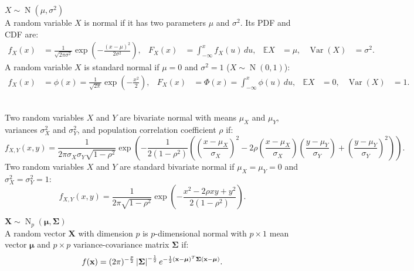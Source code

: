\documentclass{huhtakm-template-book-v2}
\newcommand{\expect}{\mathbb{E}}
\DeclareMathOperator{\N}{N}
\DeclareMathOperator{\Var}{Var}
\begin{document}
    \begin{seg} $X \sim \N(\mu,\sigma^{2})$\\
        A random variable $X$ is normal if it has two parameters $\mu$ and $\sigma^{2}$. Its PDF and CDF are:
        \begin{align*}
            f_{X}(x) &= \frac{1}{\sqrt{2\pi\sigma^{2}}}\exp\left(-\frac{(x-\mu)^{2}}{2\sigma^{2}}\right), & F_{X}(x) &= \int_{-\infty}^{x}f_{X}(u)\,du, & \expect{X} &= \mu, & \Var(X) &= \sigma^{2}.
        \end{align*}
        A random variable $X$ is standard normal if $\mu = 0$ and $\sigma^{2} = 1$ ($X \sim \N(0,1)$):
        \begin{align*}
            f_{X}(x) &= \phi(x) = \frac{1}{\sqrt{2\pi}}\exp\left(-\frac{x^{2}}{2}\right), & F_{X}(x) &= \Phi(x) = \int_{-\infty}^{x}\phi(u)\,du, & \expect{X} &= 0, & \Var(X) &= 1.
        \end{align*}
    \end{seg}
    \begin{seg}\\
        Two random variables $X$ and $Y$ are bivariate normal with means $\mu_{X}$ and $\mu_{Y}$, variances $\sigma_{X}^{2}$ and $\sigma_{Y}^{2}$, and population correlation coefficient $\rho$ if:
        \begin{equation*}
            f_{X,Y}(x, y) = \frac{1}{2\pi\sigma_{X}\sigma_{Y}\sqrt{1-\rho^{2}}}\exp\left(-\frac{1}{2(1-\rho^{2})}\left(\left(\frac{x-\mu_{X}}{\sigma_{X}}\right)^{2}-2\rho\left(\frac{x-\mu_{X}}{\sigma_{X}}\right)\left(\frac{y-\mu_{Y}}{\sigma_{Y}}\right)+\left(\frac{y-\mu_{Y}}{\sigma_{Y}}\right)^{2}\right)\right).
        \end{equation*}
        Two random variables $X$ and $Y$ are standard bivariate normal if $\mu_{X} = \mu_{Y} = 0$ and $\sigma_{X}^{2} = \sigma_{Y}^{2} = 1$:
        \begin{equation*}
            f_{X,Y}(x, y) = \frac{1}{2\pi\sqrt{1-\rho^{2}}}\exp\left(-\frac{x^{2}-2\rho xy+y^{2}}{2(1-\rho^{2})}\right).
        \end{equation*}
    \end{seg}
    \begin{seg} $\mathbf{X} \sim \N_{p}(\boldsymbol{\mu},\mathbf{\Sigma})$\\
        A random vector $\mathbf{X}$ with dimension $p$ is $p$-dimensional normal with $p\times 1$ mean vector $\boldsymbol{\mu}$ and $p\times p$ variance-covariance matrix $\mathbf{\Sigma}$ if:
        \begin{equation*}
            f(\mathbf{x}) = (2\pi)^{-\frac{p}{2}}\left|{\mathbf{\Sigma}}\right|^{-\frac{1}{2}}e^{-\frac{1}{2}(\mathbf{x}-\boldsymbol{\mu})^{T}\mathbf{\Sigma}(\mathbf{x}-\boldsymbol{\mu})}.
        \end{equation*}
    \end{seg}
\end{document}
